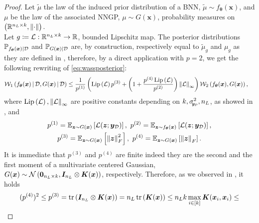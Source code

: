 \begin{proof}
	Let $\widetilde{\mu}$ the law of the induced prior distribution of a BNN, $\widetilde{\mu} \sim f_{\bm{\theta}}(\bm{x})$, and $\mu$ be the law of the associated NNGP, $\mu \sim G(\bm{x})$, probability measures on $\left(\real^{n_L \times k}, \norm{\cdot}\right)$. \\
	Let $g \coloneqq \mathcal{L}: \real^{n_L \times k} \to \real$, bounded Lipschitz map.
	The posterior distributions $\mathbb{P}_{f_{\bm{\theta}}(\bm{x}) | \train}$ and $\mathbb{P}_{G(\bm{x}) | \train}$ are, by construction, respectively equal to $\widetilde{\mu}_g$ and $\mu_g$ as they are defined in , therefore, by a direct application with $p = 2$, we get the following rewriting of \cref{eq:wassposterior}:
	\begin{equation} \label{eq:wasspostcor}
		\begin{aligned}
			& \wass[1]{f_{\bm{\theta}}(\bm{x}) \given \train}{G(\bm{x}) \given \train} \leq \frac{1}{p^{(1)}} \left(\lipschitz{\mathcal{L}} p^{(3)} + \left(1 + \frac{p^{(4)} \lipschitz{\mathcal{L}}}{p^{(2)}}\right) \norm{\mathcal{L}}_{\infty}\right) \wass[2]{f_{\bm{\theta}}(\bm{x})}{G(\bm{x})},
		\end{aligned}
	\end{equation}
	where $\lipschitz{\mathcal{L}}, \norm{\mathcal{L}}_{\infty}$ are positive constants depending on $k, \sigmay^2, n_L$, as showed in , and
	\begin{equation*}
		\begin{gathered}
			p^{(1)} = \mean[\bm{z} \sim G(\bm{x})]{\mathcal{L}(\bm{z}; \bm{y}_{\mathcal{D}})}, \ p^{(2)} = \mean[\bm{z} \sim f_{\bm{\theta}}(\bm{x})]{\mathcal{L}(\bm{z}; \bm{y}_{\mathcal{D}})}, \\
			p^{(3)} = \mean[\bm{z} \sim G(\bm{x})]{\norm{\bm{z}}_F^{2}}, \ p^{(4)} = \mean[\bm{z} \sim G(\bm{x})]{\norm{\bm{z}}_F}.
		\end{gathered}
	\end{equation*}
	It is immediate that $p^{(3)}$ and $p^{(4)}$ are finite indeed they are the second and the first moment of a multivariate centered Gaussian, $G(\bm{x}) \sim \normal{\bm{0}_{n_L \times k}}{\bm{I}_{n_L} \otimes \bm{K}(\bm{x})}$, respectively. Therefore, as we observed in , it holds
	\begin{align} \label{eq:p3-4}
	(p^{(4)})^2 \leq p^{(3)} & = \trace{\bm{I}_{n_L} \otimes \bm{K}(\bm{x})} = n_L \trace{\bm{K}(\bm{x})} \leq n_L k \max_{i \in [k]} \bm{K}(\bm{x}_i, \bm{x}_i) \leq \nonumber \\

\end{align}
\end{proof}
